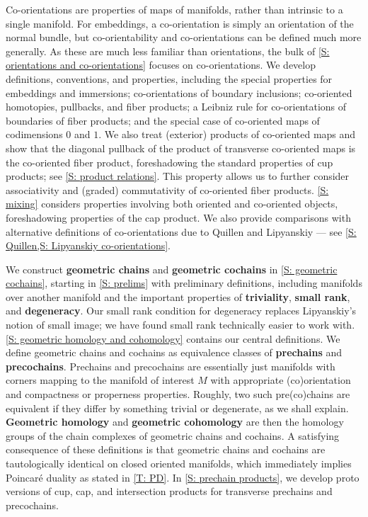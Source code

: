 Co-orientations are properties of maps of manifolds, rather than intrinsic to a single manifold.
For embeddings, a co-orientation is simply an orientation of the normal bundle, but co-orientability and co-orientations can be defined much more generally.
As these are much less familiar than orientations, the bulk of \cref{S: orientations and co-orientations} focuses on co-orientations.
We develop definitions, conventions, and properties, including the special properties for embeddings and immersions; co-orientations of boundary inclusions; co-oriented homotopies, pullbacks, and fiber products; a Leibniz rule for co-orientations of boundaries of fiber products; and the special case of co-oriented maps of codimensions $0$ and $1$.
We also treat (exterior) products of co-oriented maps and show that the diagonal pullback of the product of transverse co-oriented maps is the co-oriented fiber product, foreshadowing the standard properties of cup products; see \cref{S: product relations}.
This property allows us to further consider associativity and (graded) commutativity of co-oriented fiber products.
\cref{S: mixing} considers properties involving both oriented and co-oriented objects, foreshadowing properties of the cap product.
We also provide comparisons with alternative definitions of co-orientations due to Quillen and Lipyanskiy --- see \cref{S: Quillen,S: Lipyanskiy co-orientations}.

We construct \textbf{geometric chains} and \textbf{geometric cochains} in \cref{S: geometric cochains}, starting in \cref{S: prelims} with preliminary definitions, including manifolds over another manifold and the important properties of \textbf{triviality}, \textbf{small rank}, and \textbf{degeneracy}.
Our small rank condition for degeneracy replaces Lipyanskiy's notion of small image; we have found small rank technically easier to work with.
\cref{S: geometric homology and cohomology} contains our central definitions.
We define geometric chains and cochains as equivalence classes of \textbf{prechains} and \textbf{precochains}.
Prechains and precochains are essentially just manifolds with corners mapping to the manifold of interest $M$ with appropriate (co)orientation and compactness or properness properties.
Roughly, two such pre(co)chains are equivalent if they differ by something trivial or degenerate, as we shall explain.
\textbf{Geometric homology} and \textbf{geometric cohomology} are then the homology groups of the chain complexes of geometric chains and cochains.
A satisfying consequence of these definitions is that geometric chains and cochains are tautologically identical on closed oriented manifolds, which immediately implies Poincar\'e duality as stated in \cref{T: PD}.
In \cref{S: prechain products}, we develop proto versions of cup, cap, and intersection products for transverse prechains and precochains.

